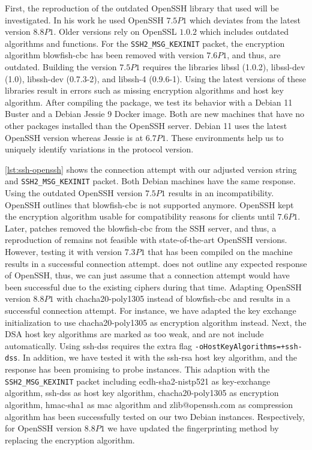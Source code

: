 First, the reproduction of the outdated OpenSSH library that \citet{vetterl2020} used will be investigated.
In his work he used OpenSSH $7.5P1$ which deviates from the latest version $8.8P1$.
Older versions rely on OpenSSL $1.0.2$ which includes outdated algorithms and functions.
For the \verb|SSH2_MSG_KEXINIT| packet, the encryption algorithm blowfish-cbc has been removed with version $7.6P1$, and thus, are outdated.
Building the version $7.5P1$ requires the libraries libssl (1.0.2), libssl-dev (1.0), libssh-dev (0.7.3-2), and libssh-4 (0.9.6-1).
Using the latest versions of these libraries result in errors such as missing encryption algorithms and host key algorithm.
After compiling the package, we test its behavior with a Debian 11 Buster and a Debian Jessie 9 Docker image.
Both are new machines that have no other packages installed than the OpenSSH server.
Debian 11 uses the latest OpenSSH version whereas Jessie is at $6.7P1$.
These environments help us to uniquely identify variations in the protocol version.

\begin{figure}
    
\end{figure}

\autoref{lst:ssh-openssh} shows the connection attempt with our adjusted version string and \verb|SSH2_MSG_KEXINIT| packet.
Both Debian machines have the same response.
Using the outdated OpenSSH version $7.5P1$ results in an incompatibility.
OpenSSH outlines that blowfish-cbc is not supported anymore.
OpenSSH kept the encryption algorithm usable for compatibility reasons for clients until $7.6P1$.
Later, patches removed the blowfish-cbc from the SSH server, and thus, a reproduction of \citet{vetterl2020} remains not feasible with state-of-the-art OpenSSH versions.
However, testing it with version $7.3P1$ that has been compiled on the machine results in a successful connection attempt.
\citet{vetterl2020} does not outline any expected response of OpenSSH, thus, we can just assume that a connection attempt would have been successful due to the existing ciphers during that time.
Adapting OpenSSH version $8.8P1$ with chacha20-poly1305 instead of blowfish-cbc and results in a successful connection attempt.
For instance, we have adapted the key exchange initialization to use chacha20-poly1305 as encryption algorithm instead.
Next, the DSA host key algorithms are marked as too weak, and are not include automatically.
Using ssh-dss requires the extra flag \verb|-oHostKeyAlgorithms=+ssh-dss|.
In addition, we have tested it with the ssh-rsa host key algorithm, and the response has been promising to probe instances.
This adaption with the \verb|SSH2_MSG_KEXINIT| packet including ecdh-sha2-nistp521 as key-exchange algorithm, ssh-dss as host key algorithm, chacha20-poly1305 as encryption algorithm, hmac-sha1 as mac algorithm and zlib@openssh.com as compression algorithm has been successfully tested on our two Debian instances.
Respectively, for OpenSSH version $8.8P1$ we have updated the fingerprinting method by replacing the encryption algorithm.

